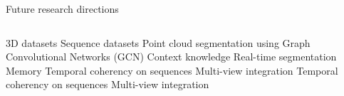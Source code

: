 \begin{frame}[t]{Future research directions} 
    \begin{columns}[c]
            \newline
            \newline
                3D datasets
            \newline
            \newline
                Sequence datasets
            \newline
            \newline
                Point cloud segmentation using  Graph Convolutional Networks (GCN)
            \newline
            \newline
                Context knowledge
            \newline
            \newline
                Real-time segmentation
            \newline
            \newline
                Memory
            \newline
            \newline
                Temporal coherency on sequences
            \newline
            \newline
                Multi-view integration        
        \newline
            \newline
                Temporal coherency on sequences
            \newline
            \newline
                Multi-view integration 
    \end{columns}
    
\end{frame}

        
